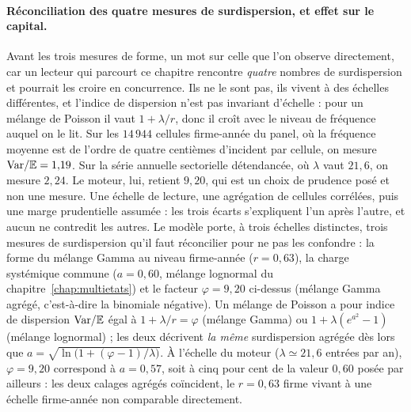 \paragraph{Réconciliation des quatre mesures de surdispersion, et effet sur le capital.}
Avant les trois mesures de forme, un mot sur celle que l'on observe directement, car un lecteur
qui parcourt ce chapitre rencontre \emph{quatre} nombres de surdispersion et pourrait les croire
en concurrence. Ils ne le sont pas, ils vivent à des échelles différentes, et
l'indice de dispersion n'est pas invariant d'échelle : pour un mélange de Poisson il
vaut $1+\lambda/r$, donc il croît avec le niveau de fréquence auquel on le lit. Sur les
$14\,944$ cellules firme-année du panel, où la fréquence moyenne est de l'ordre de quatre
centièmes d'incident par cellule, on mesure $\mathrm{Var}/\mathbb{E}=1{,}19$. Sur la série annuelle sectorielle
détendancée, où $\lambda$ vaut $21{,}6$, on mesure $2{,}24$. Le moteur, lui, retient $9{,}20$,
qui est un choix de prudence posé et non une mesure. Une échelle de lecture, une
agrégation de cellules corrélées, puis une marge prudentielle assumée : les trois écarts
s'expliquent l'un après l'autre, et aucun ne contredit les autres.
Le modèle porte, à trois échelles distinctes, trois mesures de surdispersion qu'il faut
réconcilier pour ne pas les confondre : la forme du mélange Gamma au niveau firme-année
($r=0{,}63$), la charge systémique commune ($a=0{,}60$, mélange lognormal du
chapitre~\ref{chap:multietats}) et le facteur $\varphi=9{,}20$ ci-dessus (mélange Gamma
agrégé, c'est-à-dire la binomiale négative). Un mélange de Poisson a pour indice de dispersion
$\mathrm{Var}/\mathbb{E}$ égal à $1+\lambda/r=\varphi$ (mélange Gamma) ou $1+\lambda(e^{a^2}-1)$ (mélange
lognormal) ; les deux décrivent \emph{la même} surdispersion agrégée dès lors que
$a=\sqrt{\ln\!\bigl(1+(\varphi-1)/\lambda\bigr)}$. À l'échelle du moteur ($\lambda\simeq 21{,}6$
entrées par an), $\varphi=9{,}20$ correspond à $a=0{,}57$, soit à cinq pour cent de la valeur
$0{,}60$ posée par ailleurs : les deux calages agrégés coïncident, le $r=0{,}63$ firme vivant à
une échelle firme-année non comparable directement.

